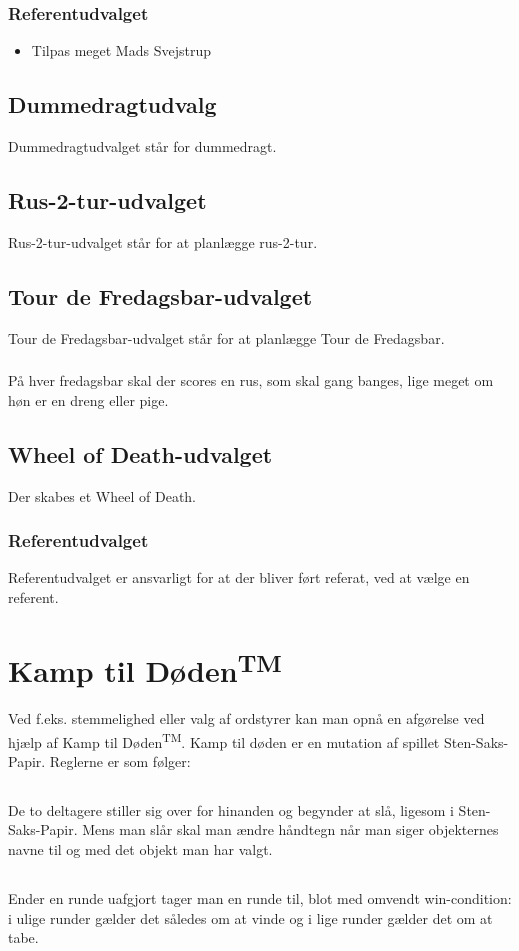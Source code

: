 \documentclass{article}
\begin{document}
\subsubsection{Referentudvalget}
\begin{itemize}
    \item Tilpas meget Mads Svejstrup
\end{itemize}

\subsection{Dummedragtudvalg}
Dummedragtudvalget står for dummedragt.
\subsection{Rus-2-tur-udvalget}
Rus-2-tur-udvalget står for at planlægge rus-2-tur.
\subsection{Tour de Fredagsbar-udvalget}
Tour de Fredagsbar-udvalget står for at planlægge Tour de Fredagsbar.
\subsubsection{}
På hver fredagsbar skal der scores en rus, som skal gang banges, lige meget om høn er en dreng eller pige.
\subsection{Wheel of Death-udvalget}
Der skabes et Wheel of Death.
\subsubsection{Referentudvalget}
Referentudvalget er ansvarligt for at der bliver ført referat, ved at vælge en referent.


\section{Kamp til Døden\textsuperscript{TM}}
Ved f.eks. stemmelighed eller valg af ordstyrer kan man opnå en afgørelse ved hjælp af Kamp til Døden\textsuperscript{TM}. Kamp til døden er en mutation af spillet Sten-Saks-Papir. Reglerne er som følger:
\subsection{}
De to deltagere stiller sig over for hinanden og begynder at slå, ligesom i Sten-Saks-Papir. Mens man slår skal man ændre håndtegn når man siger objekternes navne til og med det objekt man har valgt.
\subsection{}
Ender en runde uafgjort tager man en runde til, blot med omvendt win-condition: i ulige runder gælder det således om at vinde og i lige runder gælder det om at tabe.


\vfill
\doclicenseThis
\end{document}
